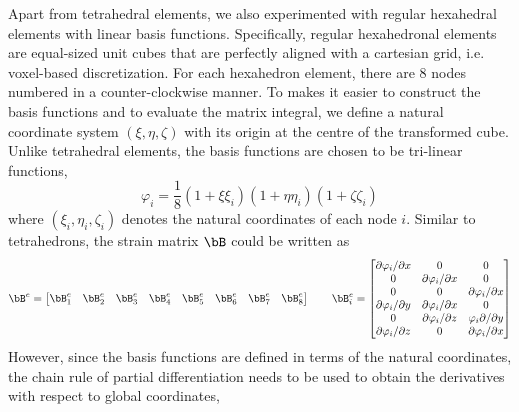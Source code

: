 \documentclass[11pt,titlepage]{article}
\begin{document}
Apart from tetrahedral elements, we also experimented with regular hexahedral elements with linear basis functions. Specifically, regular hexahedronal elements are equal-sized unit cubes that are perfectly aligned with a cartesian grid, i.e. voxel-based discretization. For each hexahedron element, there are 8 nodes numbered in a counter-clockwise manner. To makes it easier to construct the basis functions and to evaluate the matrix integral, we define a natural coordinate system $(\xi,\eta,\zeta)$ with its origin at the centre of the transformed cube. Unlike tetrahedral elements, the basis functions are chosen to be tri-linear functions,
\[
    \varphi_i = \frac{1}{8} (1+\xi\xi_{i})(1+\eta\eta_{i})(1+\zeta\zeta_{i})
\]
where $(\xi_{i},\eta_{i},\zeta_{i})$ denotes the natural coordinates of each node $i$. Similar to tetrahedrons, the strain matrix $\bB$ could be written as
\[
    \bB^e
    = 
    \begin{bmatrix}
    \bB_1^e & \bB_2^e & \bB_3^e & \bB_4^e & \bB_5^e & \bB_6^e & \bB_7^e & \bB_8^e
    \end{bmatrix}
    \quad\quad
    \bB_i^e = 
    \begin{bmatrix}
        \partial \varphi_i / \partial x & 0 & 0 \\
        0 & \partial \varphi_i / \partial x & 0 \\
        0 & 0 & \partial \varphi_i / \partial x \\
        \partial \varphi_i / \partial y & \partial \varphi_i /\partial x & 0 \\
        0 & \partial \varphi_i / \partial z & \varphi_i \partial /\partial y \\
        \partial \varphi_i/ \partial z & 0 & \partial \varphi_i /\partial x \\
    \end{bmatrix}
\]
However, since the basis functions are defined in terms of the natural coordinates, the chain rule of partial differentiation needs to be used to obtain the derivatives with respect to global coordinates,
\end{document}
